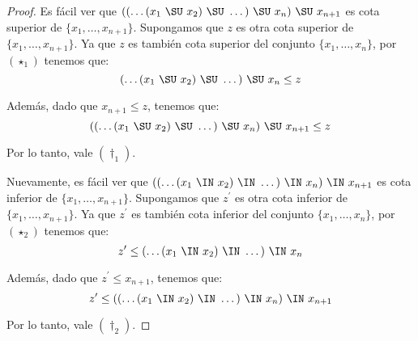 \begin{proof}
    \vspace{5mm}
    \PN Es fácil ver que $((\dotsc(x_{1} \ \SU \ x_{2}) \ \SU \ \dotsc) \ \SU \ x_{n}) \ \SU \ x_{n+1}$ es cota superior
    de $ \{x_{1}, \dotsc, x_{n+1}\}$. Supongamos que $z$ es otra cota superior de $\{x_{1}, \dotsc, x_{n+1}\}$. Ya que
    $z$ es también cota superior del conjunto $\{x_{1}, \dotsc, x_{n}\}$, por $(\star_{1})$ tenemos que:
    \[
      (\dotsc (x_{1} \ \SU \ x_{2}) \ \SU \ \dotsc) \ \SU \ x_{n} \leq z
    \]

    \PN Además, dado que $x_{n+1} \leq z$, tenemos que:
    \[
      ((\dotsc (x_{1} \ \SU \ x_{2}) \ \SU \ \dotsc) \ \SU \ x_{n}) \ \SU \ x_{n+1} \leq z
    \]

    \PN Por lo tanto, vale $(\dag_{1})$.

    \vspace{5mm}
    \PN Nuevamente, es fácil ver que $((\dotsc(x_{1} \ \IN \ x_{2}) \ \IN \ \dotsc) \ \IN \ x_{n}) \ \IN \ x_{n+1}$ es
    cota inferior de $ \{x_{1}, \dotsc, x_{n+1}\}$. Supongamos que $z^{\prime}$ es otra cota inferior de $\{x_{1},
    \dotsc, x_{n+1}\}$. Ya que $z^{\prime}$ es también cota inferior del conjunto $\{x_{1}, \dotsc, x_{n}\}$, por
    $(\star_{2})$ tenemos que:
    \[
      z^{\prime} \leq (\dotsc (x_{1} \ \IN \ x_{2}) \ \IN \ \dotsc) \ \IN \ x_{n}
    \]

    \PN Además, dado que $z^{\prime} \leq x_{n+1}$, tenemos que:
    \[
      z^{\prime} \leq ((\dotsc (x_{1} \ \IN \ x_{2}) \ \IN \ \dotsc) \ \IN \ x_{n}) \ \IN \ x_{n+1}
    \]

    \PN Por lo tanto, vale $(\dag_{2})$.

  \end{proof}

